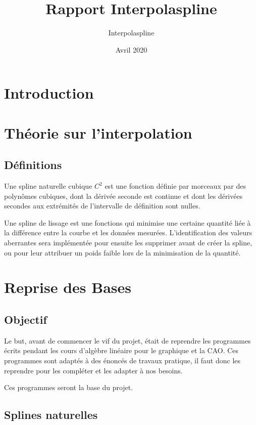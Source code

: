 \documentclass[a4paper,12pt]{article} %
\title{Rapport Interpolaspline}
\author{Interpolaspline}
\date{Avril 2020}
\begin{document}
\maketitle

\section{Introduction}

\section{Théorie sur l'interpolation}

\subsection{Définitions}

Une spline naturelle cubique $C^{2}$ est une fonction définie par morceaux par des polynômes cubiques, dont la dérivée seconde est continue et dont les dérivées secondes aux extrémités de l'intervalle de définition sont nulles. 

Une spline de lissage est une fonctions qui minimise une certaine quantité liée à la différence entre la courbe et les données mesurées. L'identification des valeurs aberrantes sera implémentée pour ensuite les supprimer avant de créer la spline, ou pour leur attribuer un poids faible lors de la minimisation de la quantité.

\section{Reprise des Bases}

\subsection{Objectif}

Le but, avant de commencer le vif du projet, était de reprendre les programmes écrits pendant les cours d'algèbre linéaire pour le graphique et la CAO. Ces programmes sont adaptés à des énoncés de travaux pratique, il faut donc les reprendre pour les compléter et les adapter à nos besoins.

Ces programmes seront la base du projet.

\subsection{Splines naturelles}
\end{document}
